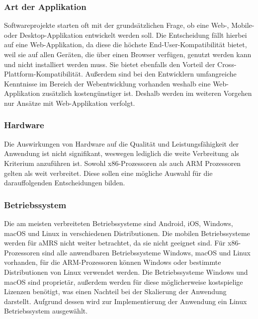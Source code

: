 \subsubsection*{Art der Applikation}
Softwareprojekte starten oft mit der grundsätzlichen Frage, ob eine Web-, Mobile- oder Desktop-Applikation entwickelt werden soll. Die Entscheidung fällt hierbei auf eine Web-Applikation, da diese die höchste End-User-Kompatibilität bietet, weil sie auf allen Geräten, die über einen Browser verfügen, genutzt werden kann und nicht installiert werden muss.
Sie bietet ebenfalls den Vorteil der Cross-Plattform-Kompatibilität.
Außerdem sind bei den Entwicklern umfangreiche Kenntnisse im Bereich der Webentwicklung vorhanden weshalb eine Web-Applikation zusätzlich kostengünstiger ist. 
Deshalb werden im weiteren Vorgehen nur Ansätze mit Web-Applikation verfolgt.
\subsubsection*{Hardware}
Die Auswirkungen von Hardware auf die Qualität und Leistungsfähigkeit der Anwendung ist nicht signifikant, weswegen lediglich die weite Verbreitung als Kriterium anzuführen ist.
Sowohl x86-Prozessoren als auch ARM Prozessoren gelten als weit verbreitet.
Diese sollen eine mögliche Auswahl für die darauffolgenden Entscheidungen bilden.
\subsubsection*{Betriebssystem}
Die am meisten verbreiteten Betriebssysteme sind Android, iOS, Windows, macOS und Linux in verschiedenen Distributionen.
Die mobilen Betriebssysteme werden für \ac{aMRS} nicht weiter betrachtet, da sie nicht geeignet sind.
Für x86-Prozessoren sind alle anwendbaren Betriebssysteme Windows, macOS und Linux vorhanden, für die ARM-Prozessoren können Windows oder bestimmte Distributionen von Linux verwendet werden.
Die Betriebssysteme Windows und macOS sind proprietär, außerdem werden für diese möglicherweise kostspielige Lizenzen benötigt, was einen Nachteil bei der Skalierung der Anwendung darstellt.
Aufgrund dessen wird zur Implementierung der Anwendung ein Linux Betriebssystem ausgewählt.

